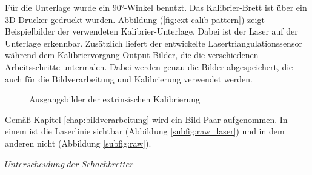 		Für die Unterlage wurde ein 90°-Winkel benutzt. Das Kalibrier-Brett ist über ein 3D-Drucker gedruckt wurden. Abbildung (\ref{fig:ext-calib-pattern}) zeigt Beispielbilder der verwendeten Kalibrier-Unterlage. Dabei ist der Laser auf der Unterlage erkennbar. \newline
		Zusätzlich liefert der entwickelte Lasertriangulationssensor während dem Kalibriervorgang Output-Bilder, die die verschiedenen Arbeitsschritte untermalen. Dabei werden genau die Bilder abgespeichert, die auch für die Bildverarbeitung und Kalibrierung verwendet werden.
		
		\begin{figure}[h]
			\centering
			\caption{Ausgangsbilder der extrinsischen Kalibrierung}
			\label{fig:ext-calib-raw}
		\end{figure} 
	
		Gemäß Kapitel \ref{chap:bildverarbeitung} wird ein Bild-Paar aufgenommen. In einem ist die Laserlinie sichtbar (Abbildung \ref{subfig:raw_laser}) und in dem anderen nicht (Abbildung \ref{subfig:raw}).
		
		\newpage
		
		$\underline{Unterscheidung \; der \; Schachbretter}$
		
